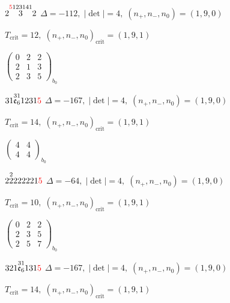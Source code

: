 \documentclass[10pt]{article}
\begin{document}
\smallskip

$2\overset{\textcolor{red}{5}123141}{3}2$ \quad $\Delta=-112,\; |\det|=4,\; (n_+,n_-,n_0)=(1,9,0)$

\hspace{1em}$T_{\text{crit}}=12,\; (n_+,n_-,n_0)_{\text{crit}}=(1,9,1)$

\hspace{2em}$\left(\begin{smallmatrix}0 & 2 & 2 \\ 2 & 1 & 3 \\ 2 & 3 & 5\end{smallmatrix}\right)_{\!b_0}$

\smallskip

$31\overset{31}{\mathfrak{e}_6}1231\textcolor{red}{5}$ \quad $\Delta=-167,\; |\det|=4,\; (n_+,n_-,n_0)=(1,9,0)$

\hspace{1em}$T_{\text{crit}}=14,\; (n_+,n_-,n_0)_{\text{crit}}=(1,9,1)$

\hspace{2em}$\left(\begin{smallmatrix}4 & 4 \\ 4 & 4\end{smallmatrix}\right)_{\!b_0}$

\smallskip

$2\overset{2}{2}222221\textcolor{red}{5}$ \quad $\Delta=-64,\; |\det|=4,\; (n_+,n_-,n_0)=(1,9,0)$

\hspace{1em}$T_{\text{crit}}=10,\; (n_+,n_-,n_0)_{\text{crit}}=(1,9,1)$

\hspace{2em}$\left(\begin{smallmatrix}0 & 2 & 2 \\ 2 & 3 & 5 \\ 2 & 5 & 7\end{smallmatrix}\right)_{\!b_0}$

\smallskip

$321\overset{31}{\mathfrak{e}_6}131\textcolor{red}{5}$ \quad $\Delta=-167,\; |\det|=4,\; (n_+,n_-,n_0)=(1,9,0)$

\hspace{1em}$T_{\text{crit}}=14,\; (n_+,n_-,n_0)_{\text{crit}}=(1,9,1)$
\end{document}
